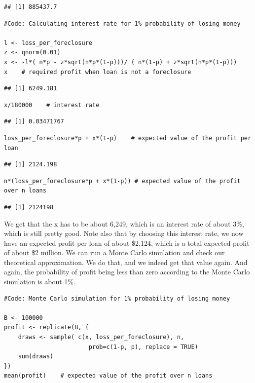 \documentclass[
]{article}
\begin{document}
\begin{verbatim}
## [1] 885437.7
\end{verbatim}

\begin{verbatim}
#Code: Calculating interest rate for 1% probability of losing money

l <- loss_per_foreclosure
z <- qnorm(0.01)
x <- -l*( n*p - z*sqrt(n*p*(1-p)))/ ( n*(1-p) + z*sqrt(n*p*(1-p)))
x    # required profit when loan is not a foreclosure
\end{verbatim}

\begin{verbatim}
## [1] 6249.181
\end{verbatim}

\begin{verbatim}
x/180000    # interest rate
\end{verbatim}

\begin{verbatim}
## [1] 0.03471767
\end{verbatim}

\begin{verbatim}
loss_per_foreclosure*p + x*(1-p)    # expected value of the profit per loan
\end{verbatim}

\begin{verbatim}
## [1] 2124.198
\end{verbatim}

\begin{verbatim}
n*(loss_per_foreclosure*p + x*(1-p)) # expected value of the profit over n loans
\end{verbatim}

\begin{verbatim}
## [1] 2124198
\end{verbatim}

We get that the x has to be about 6,249, which is an interest rate of
about 3\%, which is still pretty good. Note also that by choosing this
interest rate, we now have an expected profit per loan of about \$2,124,
which is a total expected profit of about \$2 million. We can run a
Monte Carlo simulation and check our theoretical approximation. We do
that, and we indeed get that value again. And again, the probability of
profit being less than zero according to the Monte Carlo simulation is
about 1\%.

\begin{verbatim}
#Code: Monte Carlo simulation for 1% probability of losing money

B <- 100000
profit <- replicate(B, {
    draws <- sample( c(x, loss_per_foreclosure), n, 
                        prob=c(1-p, p), replace = TRUE) 
    sum(draws)
})
mean(profit)    # expected value of the profit over n loans
\end{verbatim}
\end{document}
